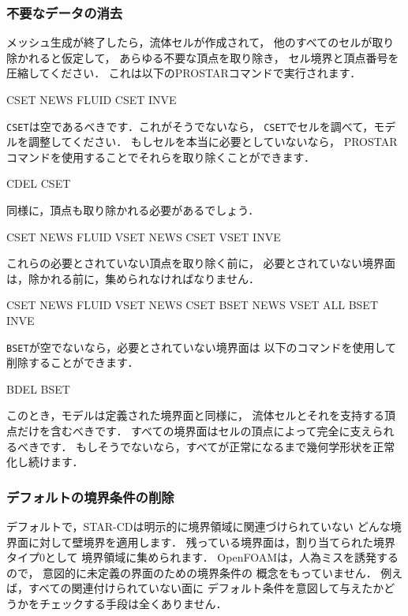 \subsubsection{不要なデータの消去}
\label{sssec:5.5.2.2}
メッシュ生成が終了したら，流体セルが作成されて，
他のすべてのセルが取り除かれると仮定して，
あらゆる不要な頂点を取り除き，
セル境界と頂点番号を圧縮してください．
これは以下の\textsf{PROSTAR}コマンドで実行されます．
\begin{OFverbatim}[terminal]
CSET NEWS FLUID
CSET INVE
\end{OFverbatim}
\texttt{CSET}は空であるべきです．これがそうでないなら，
\texttt{CSET}でセルを調べて，モデルを調整してください．
もしセルを本当に必要としていないなら，
\textsf{PROSTAR}コマンドを使用することでそれらを取り除くことができます．
\begin{OFverbatim}[terminal]
CDEL CSET
\end{OFverbatim}
同様に，頂点も取り除かれる必要があるでしょう．
\begin{OFverbatim}[terminal]
CSET NEWS FLUID
VSET NEWS CSET
VSET INVE
\end{OFverbatim}
これらの必要とされていない頂点を取り除く前に，
必要とされていない境界面は，除かれる前に，集められなければなりません．
\begin{OFverbatim}[terminal]
CSET NEWS FLUID
VSET NEWS CSET
BSET NEWS VSET ALL
BSET INVE
\end{OFverbatim}
\texttt{BSET}が空でないなら，必要とされていない境界面は
以下のコマンドを使用して削除することができます．
\begin{OFverbatim}[terminal]
BDEL BSET
\end{OFverbatim}
このとき，モデルは定義された境界面と同様に，
流体セルとそれを支持する頂点だけを含むべきです．
すべての境界面はセルの頂点によって完全に支えられるべきです．
もしそうでないなら，すべてが正常になるまで幾何学形状を正常化し続けます．

\subsubsection{デフォルトの境界条件の削除}
\label{sssec:5.5.2.3}
デフォルトで，STAR-CDは明示的に境界領域に関連づけられていない
どんな境界面に対して壁境界を適用します．
残っている境界面は，割り当てられた境界タイプ0として
境界領域に集められます．
OpenFOAMは，人為ミスを誘発するので，
意図的に未定義の界面のための境界条件の
概念をもっていません．
例えば，すべての関連付けられていない面に
デフォルト条件を意図して与えたかどうかをチェックする手段は全くありません．

